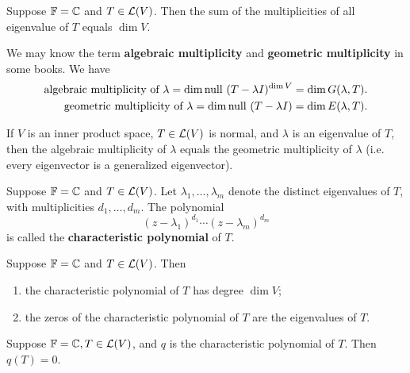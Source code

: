 \documentclass{extarticle}
\begin{document}
\begin{corollary}
    Suppose \(\mathbb{F} = \mathbb{C}\) and \(T \in \mathcal{L}(V)\). Then the sum of the multiplicities of all 
    eigenvalue of \(T\) equals \(\dim V\).
\end{corollary}

\begin{remark}
    We may know the term \textbf{algebraic multiplicity} and \textbf{geometric multiplicity} 
    in some books. We have 
    \begin{align*}
        \text{algebraic multiplicity of } \lambda = \dim \text{null } (T - \lambda I)^{\dim V} = \dim G(\lambda, T). \\ 
        \text{geometric multiplicity of } \lambda = \dim \text{null } (T - \lambda I) = \dim E(\lambda, T).
    \end{align*}
\end{remark}

\begin{remark}
    If \(V\) is an inner product space, \(T \in \mathcal{L}(V)\) is normal, and \(\lambda\) is an eigenvalue 
    of \(T\), then the algebraic multiplicity of \(\lambda\) equals the geometric multiplicity of 
    \(\lambda\) (i.e. every eigenvector is a generalized eigenvector).
\end{remark}

\begin{definition}[\textcolor{red}{characteristic polynomial}]
    Suppose \(\mathbb{F} = \mathbb{C}\) and \(T \in \mathcal{L}(V)\). Let \(\lambda_1, \ldots, \lambda_m\) denote the 
    distinct eigenvalues of \(T\), with multiplicities \(d_1, \ldots, d_m\). The polynomial 
    \[(z - \lambda_1)^{d_1} \cdots (z - \lambda_m)^{d_m}\]
    is called the \textbf{characteristic polynomial} of \(T\).
\end{definition}

\begin{corollary}
    Suppose \(\mathbb{F} = \mathbb{C}\) and \(T \in \mathcal{L}(V)\). Then 
    \begin{enumerate}[label=(\alph*)]
        \item the characteristic polynomial of \(T\) has degree \(\dim V\); 
        \item the zeros of the characteristic polynomial of \(T\) are the eigenvalues of \(T\).
    \end{enumerate}
\end{corollary}

\begin{thm}
    Suppose \(\mathbb{F} = \mathbb{C}, T \in \mathcal{L}(V)\), and \(q\) is the characteristic polynomial of \(T\). 
    Then \(q(T) = 0\).
\end{thm}
\end{document}
